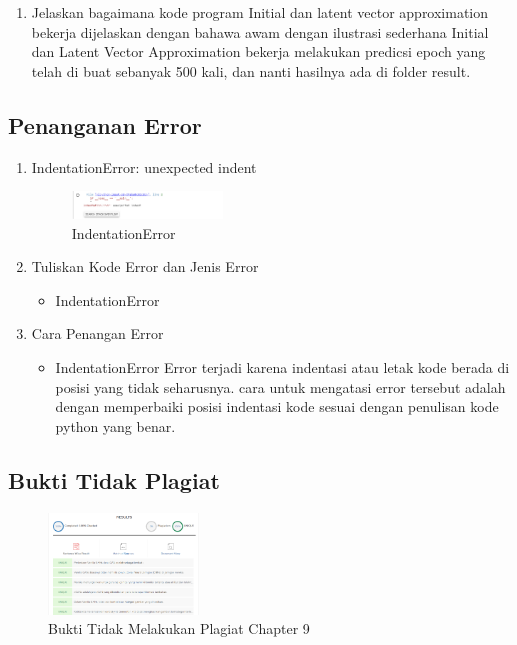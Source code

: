 \begin{enumerate}
	\item Jelaskan bagaimana kode program Initial dan latent vector approximation bekerja dijelaskan dengan bahawa awam dengan ilustrasi sederhana
    \hfill\break
    Initial dan Latent Vector Approximation bekerja melakukan predicsi epoch yang telah di buat sebanyak 500 kali, dan nanti hasilnya ada di folder result.
    
\end{enumerate}

\subsection{Penanganan Error}
\begin{enumerate}
	\item IndentationError: unexpected indent
	\begin{figure}[H]
		\includegraphics[width=4cm]{figures/1174096/tugas9/error.PNG}
		\centering
		\caption{IndentationError}
	\end{figure}
	\item Tuliskan Kode Error dan Jenis Error
	\begin{itemize}
		\item IndentationError
	\end{itemize}
	\item Cara Penangan Error
	\begin{itemize}
		\item IndentationError
		\hfill\break
		Error terjadi karena indentasi atau letak kode berada di posisi yang tidak seharusnya. cara untuk mengatasi error tersebut adalah dengan memperbaiki posisi indentasi kode sesuai dengan penulisan kode python yang benar.
	\end{itemize}
\end{enumerate}

\subsection{Bukti Tidak Plagiat}
\begin{figure}[H]
\centering
	\includegraphics[width=4cm]{figures/1174096/tugas9/plagiarisme.PNG}
	\caption{Bukti Tidak Melakukan Plagiat Chapter 9}
\end{figure}
